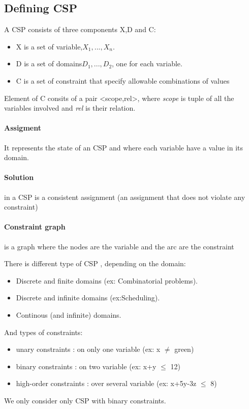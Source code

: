 \subsection{Defining CSP}
	A CSP consists of three components X,D and C:
	\begin{itemize}
		\item X is a set of variable,${X_1,...,X_n}$.
		\item D is a set of domains${D_1,...,D_2}$, one for each variable.
		\item C is a set of constraint that specify allowable combinations of values
	\end{itemize}

 Element of  C consits  of a pair  <scope,rel>, where  \textit{scope} is
 tuple of all the variables involved and \textit{rel} is their relation.

 \paragraph{Assigment} It represents the state  of an CSP and where each
variable have a value in its domain.

 \paragraph{Solution} in a CSP is a consistent assignment (an assignment
 that does not violate any constraint)

 \paragraph{Constraint  graph}  is  a  graph where  the  nodes  are  the
variable and the arc are the constraint

	There is different type of CSP , depending on the domain:
	\begin{itemize}
		\item Discrete and finite domains (ex: Combinatorial problems).
		\item Discrete and infinite domains (ex:Scheduling).
		\item Continous (and infinite) domains.
	\end{itemize}
	And types of constraints:
	\begin{itemize}
		\item unary constraints : on only one variable (ex: x $\neq$ green)
		\item binary constraints : on two variable (ex: x+y $\leq$ 12)
		\item high-order constraints : over several variable (ex: x+5y-3z $\leq$ 8)
	\end{itemize}
	We only consider only CSP with binary constraints.

